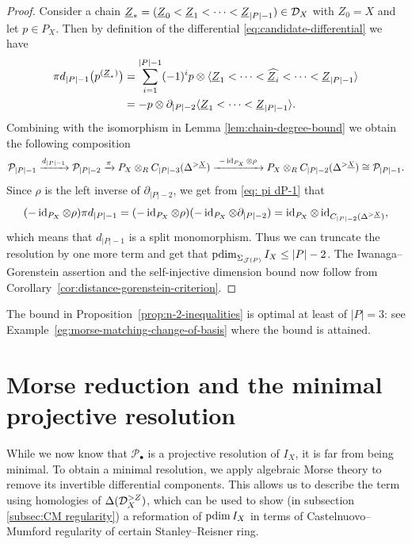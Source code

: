 \documentclass[a4paper,leqno]{amsart}
\begin{document}
\begin{proof}
Consider a chain $\underline{Z}_\ast=(\underline Z_0<\underline Z_1<\cdots<\underline Z_{|P|-1})\in \mathcal D_X$ with $Z_0=X$ and let $p\in P_X$. 
Then by definition of the differential \eqref{eq:candidate-differential} we have
\begin{align}
\pi d_{|P|-1}
\bigl(p^{(\underline{Z}_\ast)}\bigr)
&=
\sum_{i=1}^{|P|-1}(-1)^i p\otimes
\langle\underline Z_1<\cdots<\widehat{\underline Z_i}
<\cdots<\underline Z_{|P|-1}\rangle\notag
\\
&=-p\otimes\partial_{|P|-2}
\langle\underline Z_1<\cdots<\underline Z_{|P|-1}\rangle. \label{eq: pi dP-1}
\end{align}
Combining with the isomorphism in Lemma \ref{lem:chain-degree-bound} we obtain the following composition
\[ \mathcal P_{|P|-1} \xrightarrow{d_{|P|-1}} \mathcal P_{|P|-2}
\xrightarrow{\pi}
P_X\otimes_R C_{|P|-3}(\Delta^{>\underline X})\xrightarrow{\ -\id_{P_X}\otimes\rho\ }
P_X\otimes_R C_{|P|-2}(\Delta^{>\underline X})\cong \mathcal P_{|P|-1}.
\]
Since $\rho$ is the left inverse of $\partial_{|P|-2}$, we get from \eqref{eq: pi dP-1} that
\[
(-\operatorname{id}_{P_X}\otimes\rho)\pi d_{|P|-1} = 
(-\operatorname{id}_{P_X}\otimes\rho) (-\operatorname{id}_{P_X}\otimes\partial_{|P|-2}) = \operatorname{id}_{P_X}\otimes \operatorname{id}_{C_{|P|-2}(\Delta^{>\underline X})},
\]
which means that $d_{|P|-1}$ is a split monomorphism. Thus we can truncate the resolution by one more term and get that
$\operatorname{pdim}_{\Sigma_{\mathcal J(P)}}I_X\leq|P|-2$.
The Iwanaga--Gorenstein assertion and the self-injective dimension bound now follow from Corollary~\ref{cor:distance-gorenstein-criterion}.
\end{proof}

\begin{rmk}
The bound in Proposition~\ref{prop:n-2-inequalities} is optimal at least of $|P|=3$: see Example~\ref{eg:morse-matching-change-of-basis} where the bound is attained.
\end{rmk}

\section{Morse reduction and the minimal projective resolution}
\label{sec:minimal-morse}

While we now know that ${\mathcal P}_\bullet$ is a projective resolution of $I_X$, it is far from being minimal.  To obtain a minimal resolution, we apply algebraic Morse theory \cite{CLZ26} to remove its invertible differential components. 
This allows us to describe the term using homologies of $\Delta(\mathcal D_X^{>Z})$, which can be used to show (in subsection \ref{subsec:CM regularity}) a reformation of $\operatorname{pdim} I_X$ in terms of Castelnuovo--Mumford regularity of certain Stanley--Reisner ring.
\end{document}
